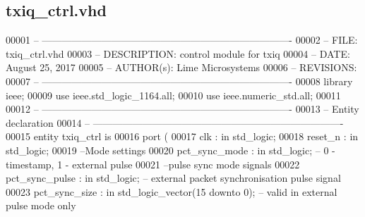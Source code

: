\subsection{txiq\+\_\+ctrl.\+vhd}
\label{txiq__ctrl_8vhd_source}

\begin{DoxyCode}
00001 \textcolor{keyword}{-- ---------------------------------------------------------------------------- }
00002 \textcolor{keyword}{-- FILE:          txiq\_ctrl.vhd}
00003 \textcolor{keyword}{-- DESCRIPTION:   control module for txiq}
00004 \textcolor{keyword}{-- DATE:          August 25, 2017}
00005 \textcolor{keyword}{-- AUTHOR(s):     Lime Microsystems}
00006 \textcolor{keyword}{-- REVISIONS:}
00007 \textcolor{keyword}{-- ---------------------------------------------------------------------------- }
00008 \textcolor{vhdlkeyword}{library }\textcolor{keywordflow}{ieee};
00009 \textcolor{vhdlkeyword}{use }ieee.std\_logic\_1164.\textcolor{keywordflow}{all};
00010 \textcolor{vhdlkeyword}{use }ieee.numeric\_std.\textcolor{keywordflow}{all};
00011 
00012 \textcolor{keyword}{-- ----------------------------------------------------------------------------}
00013 \textcolor{keyword}{-- Entity declaration}
00014 \textcolor{keyword}{-- ----------------------------------------------------------------------------}
00015 \textcolor{keywordflow}{entity }txiq_ctrl \textcolor{keywordflow}{is}
00016    \textcolor{keywordflow}{port} \textcolor{vhdlchar}{(}
00017       \textcolor{vhdlchar}{clk}                 \textcolor{vhdlchar}{:} \textcolor{keywordflow}{in} \textcolor{comment}{std\_logic};
00018       \textcolor{vhdlchar}{reset_n}             \textcolor{vhdlchar}{:} \textcolor{keywordflow}{in} \textcolor{comment}{std\_logic};
00019 \textcolor{keyword}{      --Mode settings}
00020       \textcolor{vhdlchar}{pct_sync_mode}       \textcolor{vhdlchar}{:} \textcolor{keywordflow}{in} \textcolor{comment}{std\_logic};\textcolor{keyword}{ -- 0 - timestamp, 1 - external pulse}
00021 \textcolor{keyword}{      --pulse sync mode signals}
00022       \textcolor{vhdlchar}{pct_sync_pulse}      \textcolor{vhdlchar}{:} \textcolor{keywordflow}{in} \textcolor{comment}{std\_logic};\textcolor{keyword}{ -- external packet synchronisation pulse signal}
00023       \textcolor{vhdlchar}{pct_sync_size}       \textcolor{vhdlchar}{:} \textcolor{keywordflow}{in} \textcolor{comment}{std\_logic\_vector}\textcolor{vhdlchar}{(}\textcolor{vhdllogic}{}\textcolor{vhdllogic}{15} \textcolor{keywordflow}{downto} \textcolor{vhdllogic}{}\textcolor{vhdllogic}{0}\textcolor{vhdlchar}{)};\textcolor{keyword}{ -- valid in external pulse mode only}

\end{DoxyCode}
